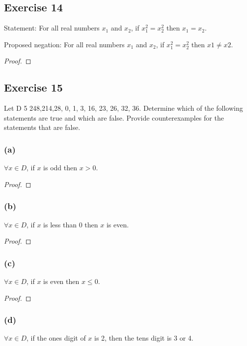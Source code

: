 \documentclass[14pt]{extarticle}
\newcommand{\fa}{\forall}
\begin{document}
\subsection{Exercise 14}
Statement: For all real numbers $x_1$ and $x_2$, if $x_1^2 = x_2^2$ then $x_1 = x_2$.

Proposed negation: For all real numbers $x_1$ and $x_2$, if $x_1^2 = x_2^2$ then $x1 \neq x2$.

\begin{proof}

\end{proof}

\subsection{Exercise 15}
Let D 5 {248,214,28, 0, 1, 3, 16, 23, 26, 32, 36}.
Determine which of the following statements are
true and which are false. Provide counterexamples
for the statements that are false.

\subsubsection{(a)}
$\fa x \in D$, if $x$ is odd then $x > 0$.

\begin{proof}

\end{proof}

\subsubsection{(b)}
$\fa x \in D$, if $x$ is less than 0 then $x$ is even.

\begin{proof}

\end{proof}

\subsubsection{(c)}
$\fa x \in D$, if $x$ is even then $x \leq 0$.

\begin{proof}

\end{proof}

\subsubsection{(d)}
$\fa x \in D$, if the ones digit of $x$ is 2, then the tens digit is 3 or 4.
\end{document}
